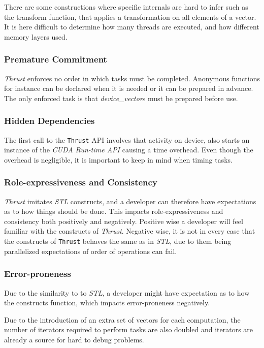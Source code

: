 There are some constructions where specific internals are hard to infer such as the transform function, that applies a transformation on all elements of a vector. It is here difficult to determine how many threads are executed, and how different memory layers used.

\subsubsection[*]{Premature Commitment}
\textit{Thrust} enforces no order in which tasks must be completed. Anonymous functions for instance can be declared when it is needed or it can be prepared in advance. The only enforced task is that \textit{device\_vector}s must be prepared before use.

\subsubsection[*]{Hidden Dependencies}
The first call to the \texttt{Thrust} API involves that activity on device, also starts an instance of the \textit{CUDA Run-time API} causing a time overhead. Even though the overhead is negligible, it is important to keep in mind when timing tasks.

\subsubsection[*]{Role-expressiveness and Consistency}
\textit{Thrust} imitates \textit{STL} constructs, and a developer can therefore have expectations as to how things should be done. This impacts role-expressiveness and consistency both positively and negatively. Positive wise a developer will feel familiar with the constructs of \textit{Thrust}. Negative wise, it is not in every case that the constructs of \texttt{Thrust} behaves the same as in \textit{STL}, due to them being parallelized expectations of order of operations can fail.

\subsubsection[*]{Error-proneness}
Due to the similarity to to \textit{STL}, a developer might have expectation as to how the constructs function, which impacts error-proneness negatively.

Due to the introduction of an extra set of vectors for each computation, the number of iterators required to perform tasks are also doubled and iterators are already a source for hard to debug problems.

